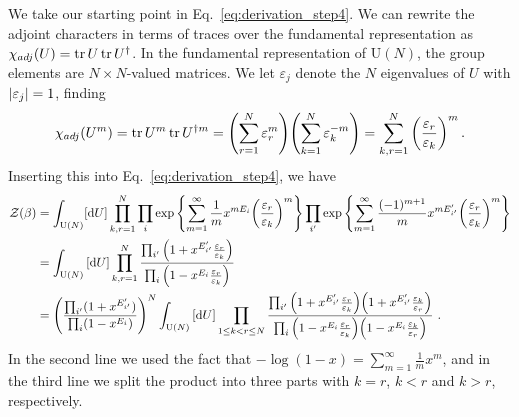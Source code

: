 \documentclass[a4paper,11pt]{article}
\begin{document}
We take our starting point in Eq.\ \eqref{eq:derivation_step4}. We can rewrite the adjoint characters in terms of traces over the fundamental representation as $\chi_{adj}(U) = \tr U \tr U^\dag$. In the fundamental representation of $\text{U}(N)$, the group elements are $N\times N$-valued matrices. We let $\varepsilon_j$ denote the $N$ eigenvalues of $U$ with $\abs{\varepsilon_j}=1$, finding
% 
\begin{equation}
	\chi_{adj}(U^m) = \tr U^m \tr U^{\dag m} = \qty(\sum_{r=1}^N \varepsilon_r^m) \qty(\sum_{k=1}^N \varepsilon_k^{-m}) = \sum_{k,r=1}^N \qty(\frac{\varepsilon_r}{\varepsilon_k})^m\,.
\end{equation}
% 
Inserting this into Eq.\ \eqref{eq:derivation_step4}, we have
% 
\begin{equation}
\begin{split}
	\mathcal{Z}(\beta) &= \int_{\text{U}(N)}\!\left[ \dd U\right] \prod_{k,r=1}^N \prod_{i}\exp \qty{ \sum_{m=1}^\infty \frac{1}{m} x^{mE_i} \qty(\frac{\varepsilon_r}{\varepsilon_k})^m }   \prod_{i'}\exp \qty{ \sum_{m=1}^\infty \frac{(-1)^{m+1}}{m} x^{mE_{i'}'} \qty(\frac{\varepsilon_r}{\varepsilon_k})^m }\\
	&= \int_{\text{U}(N)}\left[ \dd U\right] \prod_{k,r=1}^N \frac{\prod_{i'} \qty(1+x^{E_{i'}'}\frac{\varepsilon_r}{\varepsilon_k})}{\prod_i \qty(1-x^{E_i}\frac{\varepsilon_r}{\varepsilon_k})}\\
	&= \qty(\frac{\prod_{i'} (1+x^{E_{i'}'})}{\prod_i (1-x^{E_i})})^N   \int_{\text{U}(N)}\left[ \dd U\right] \prod_{1\leq k<r \leq N} \frac{\prod_{i'} \qty(1+x^{E_{i'}'}\frac{\varepsilon_r}{\varepsilon_k})\qty(1+x^{E_{i'}'}\frac{\varepsilon_k}{\varepsilon_r})}{\prod_i \qty(1-x^{E_i}\frac{\varepsilon_r}{\varepsilon_k})\qty(1-x^{E_i}\frac{\varepsilon_k}{\varepsilon_r})} \ .
\end{split}
\end{equation}
In the second line we used the fact that $-\log(1-x) = \sum_{m=1}^\infty \frac{1}{m}x^m$, and in the third line we split the product into three parts with $k=r$, $k<r$ and $k>r$, respectively.
\end{document}
